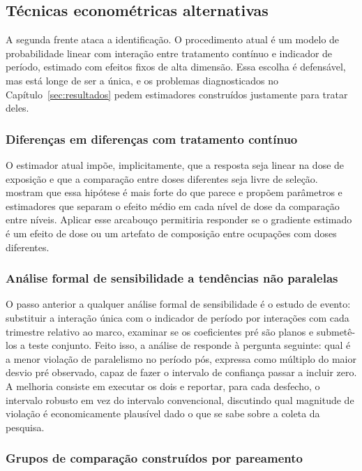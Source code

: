 \subsection{Técnicas econométricas alternativas}

A segunda frente ataca a identificação. O procedimento atual é um modelo de
probabilidade linear com interação entre tratamento contínuo e indicador de
período, estimado com efeitos fixos de alta dimensão. Essa escolha é defensável,
mas está longe de ser a única, e os problemas diagnosticados no
Capítulo~\ref{sec:resultados} pedem estimadores construídos justamente para
tratar deles.

\subsubsection{Diferenças em diferenças com tratamento contínuo}

O estimador atual impõe, implicitamente, que a resposta seja linear na dose de
exposição e que a comparação entre doses diferentes seja livre de seleção.
 mostram que essa hipótese é mais forte do que parece e
propõem parâmetros e estimadores que separam o efeito médio em cada nível de dose
da comparação entre níveis. Aplicar esse arcabouço permitiria responder se o
gradiente estimado é um efeito de dose ou um artefato de composição entre
ocupações com doses diferentes.

\subsubsection{Análise formal de sensibilidade a tendências não paralelas}

O passo anterior a qualquer análise formal de sensibilidade é o estudo de
evento: substituir a interação única com o indicador de período por interações
com cada trimestre relativo ao marco, examinar se os coeficientes pré são planos
e submetê-los a teste conjunto. Feito isso, a análise de
 responde à pergunta seguinte: qual é a menor
violação de paralelismo no período pós, expressa como múltiplo do maior desvio
pré observado, capaz de fazer o intervalo de confiança passar a incluir zero. A
melhoria consiste em executar os dois e reportar, para cada desfecho, o
intervalo robusto em vez do intervalo convencional, discutindo qual magnitude de
violação é economicamente plausível dado o que se sabe sobre a coleta da
pesquisa.

\subsubsection{Grupos de comparação construídos por pareamento}


